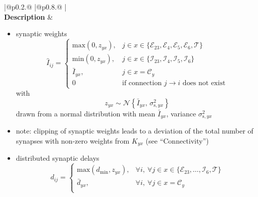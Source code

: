 \documentclass[10pt,a4paper,twoside,american]{article}
\theoremstyle{definitionstyle}
\begin{document}
\clearpage
\begin{table}[H]
\begin{tabular}{
  |@{\hspace*{\marg}}p{}@{\hspace*{\marg}}
  |@{\hspace*{\marg}}p{}@{\hspace*{\marg}}
  |}
  \hline 
  \\
  \hline 
  \textbf{Description} &
  \begin{itemize}
  \item synaptic weights
  \begin{equation}
	  \hat{I}_{ij} = \begin{cases} 
      \text{max}(0,z_{yx}), & j \in x\in\{\mathcal{E}_{23},\mathcal{E}_{4},\mathcal{E}_{5},\mathcal{E}_{6},\mathcal{T}\} \\
      \text{min}(0,z_{yx}), & j \in x\in\{\mathcal{I}_{23},\mathcal{I}_{4},\mathcal{I}_{5},\mathcal{I}_{6}\} \\
      \bar{I}_{yx}, & j \in x=\mathcal{C}_y \\
      0             & \text{if connection $j\to{}i$ does not exist}
      \end{cases}
  \end{equation}
  with
  \begin{equation}
      z_{yx} \sim\mathcal{N}\left\{\bar{I}_{yx},\,\sigma_{\text{s},yx}^2\right\}
  \end{equation}
  drawn from a normal distribution with mean $\bar{I}_{yx}$, variance $\sigma_{\text{s},yx}^2$
  \item[] note: clipping of synaptic weights leads to a deviation of the total number of synapses with non-zero weights from $K_{yx}$ (see ``Connectivity'')
  \item distributed synaptic delays
  \begin{equation}
      d_{ij} = \begin{cases} 
	      \text{max}(d_\text{min},z_{yx}), & \forall i,\ \forall j \in x\in\{\mathcal{E}_{23},\ldots,\mathcal{I}_{6},\mathcal{T}\} \\
      	\bar{d}_{yx}, & \forall i,\ \forall j \in x=\mathcal{C}_y \\
      \end{cases}

\end{equation}
\end{itemize}
\end{tabular}
\end{table}
\end{document}
